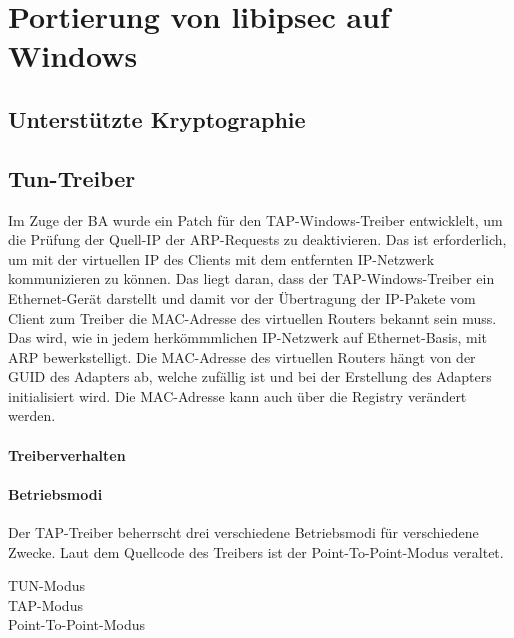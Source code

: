 


\section{Portierung von libipsec auf Windows}
\subsection{Unterstützte Kryptographie}
\subsection{Tun-Treiber}
Im Zuge der \ac{BA} wurde ein Patch für den TAP-Windows-Treiber entwicklelt, um die
Prüfung der Quell-IP der ARP-Requests zu deaktivieren. Das ist erforderlich, um mit der
virtuellen IP des Clients mit dem entfernten IP-Netzwerk kommunizieren zu können.
Das liegt daran, dass der TAP-Windows-Treiber ein Ethernet-Gerät darstellt und damit
vor der Übertragung der IP-Pakete vom Client zum Treiber die MAC-Adresse des virtuellen Routers bekannt sein muss.
Das wird, wie in jedem herkömmmlichen IP-Netzwerk auf Ethernet-Basis, mit ARP bewerkstelligt.
Die MAC-Adresse des virtuellen Routers hängt von der GUID des Adapters ab, welche zufällig ist
und bei der Erstellung des Adapters initialisiert wird. Die MAC-Adresse kann auch über die Registry verändert werden.
\paragraph{Treiberverhalten}

\paragraph{Betriebsmodi}
Der TAP-Treiber beherrscht drei verschiedene Betriebsmodi für verschiedene Zwecke.
Laut dem Quellcode des Treibers ist der Point-To-Point-Modus veraltet.
\begin{description}
\item [TUN-Modus] 
\item [TAP-Modus]
\item [Point-To-Point-Modus]
\end{description}
